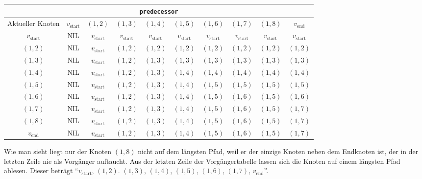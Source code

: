 \begin{center}
	\begin{tabular}{|c|ccccccccc|}
		\hline 
		\multicolumn{10}{|c|}{\texttt{predecessor}} \\ \hline
		Aktueller Knoten & $v_{\mathrm{start}}$ & $(1,2)$ & $(1,3)$ & $(1,4)$ & $(1,5)$ & $(1,6)$ & $(1,7)$ & $(1,8)$ & $v_{\mathrm{end}}$ \\ \hline
		$v_{\mathrm{start}}$ & NIL & $v_{\mathrm{start}}$ &  $v_{\mathrm{start}}$ &  $v_{\mathrm{start}}$ &  $v_{\mathrm{start}}$ &  $v_{\mathrm{start}}$ &  $v_{\mathrm{start}}$ &  $v_{\mathrm{start}}$ &  $v_{\mathrm{start}}$ \\
		$(1,2)$ & NIL &  				$v_{\mathrm{start}}$ & $(1,2)$ & $(1,2)$ & $(1,2)$ & $(1,2)$ & $(1,2)$ & $(1,2)$ & $(1,2)$ \\
		$(1,3)$ & NIL &  				$v_{\mathrm{start}}$ & $(1,2)$ & $(1,3)$ & $(1,3)$ & $(1,3)$ & $(1,3)$ & $(1,3)$ & $(1,3)$ \\
		$(1,4)$ & NIL &  				$v_{\mathrm{start}}$ & $(1,2)$ & $(1,3)$ & $(1,4)$ & $(1,4)$ & $(1,4)$ & $(1,4)$ & $(1,4)$ \\
		$(1,5)$ & NIL &  				$v_{\mathrm{start}}$ & $(1,2)$ & $(1,3)$ & $(1,4)$ & $(1,5)$ & $(1,5)$ & $(1,5)$ & $(1,5)$ \\
		$(1,6)$ & NIL &  				$v_{\mathrm{start}}$ & $(1,2)$ & $(1,3)$ & $(1,4)$ & $(1,5)$ & $(1,6)$ & $(1,5)$ & $(1,6)$ \\
		$(1,7)$ & NIL & 				$v_{\mathrm{start}}$ & $(1,2)$ & $(1,3)$ & $(1,4)$ & $(1,5)$ & $(1,6)$ & $(1,5)$ & $(1,7)$ \\
		$(1,8)$ & NIL & 				$v_{\mathrm{start}}$ & $(1,2)$ & $(1,3)$ & $(1,4)$ & $(1,5)$ & $(1,6)$ & $(1,5)$ & $(1,7)$ \\
		$v_{\mathrm{end}}$ & NIL &  	$v_{\mathrm{start}}$ & $(1,2)$ & $(1,3)$ & $(1,4)$ & $(1,5)$ & $(1,6)$ & $(1,5)$ & $(1,7)$ \\
		\hline
	\end{tabular} 
\end{center}

Wie man sieht liegt nur der Knoten $(1,8)$ nicht auf dem längsten Pfad, weil er der einzige Knoten neben dem Endknoten ist, der in der letzten Zeile nie als Vorgänger auftaucht. Aus der letzten Zeile der Vorgängertabelle lassen sich die Knoten auf einem längsten Pfad ablesen. Dieser beträgt \enquote{$v_{\mathrm{start}}$, $(1,2)$. $(1,3)$, $(1,4)$, $(1,5)$, $(1,6)$, $(1,7)$, $v_{\mathrm{end}}$}.
